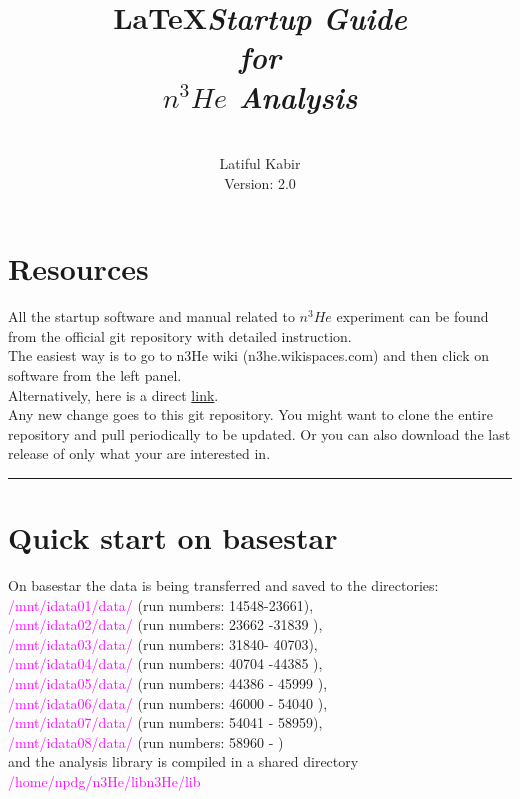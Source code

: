 \documentclass[12pt]{article}
\title{\LaTeX}
\date{}
\title{\emph{\huge\textbf{Startup Guide \\ for \\$n^3He$ Analysis}}
}
\author{\\Latiful Kabir\\
Version: 2.0
}
\begin{document}
  \maketitle
  
\newpage  
\tableofcontents
\newpage
\setcounter{tocdepth}{2}

\section{Resources}
All the startup software and manual related to $n^3He$ experiment can be found from the official git repository with detailed instruction. \\
The easiest way is to go to n3He wiki (n3he.wikispaces.com) and then click on software from the left panel.  \\
Alternatively, here is a direct \href{http://latifkabir.github.io/n3He_Soft/}{link}.\\
Any new change goes to this  git repository. You might want to clone the entire repository and pull periodically to be updated. Or you can also download the last release of only what your are interested in.  

\noindent
{\color{red} \rule{\linewidth}{1mm} }
 
\newpage
\section{Quick start on basestar}
On basestar the data is being transferred and saved to the directories: \\ \textcolor{magenta}{ /mnt/idata01/data/ } (run numbers: 14548-23661),\\ \textcolor{magenta}{ /mnt/idata02/data/ } (run numbers: 23662 -31839 ),\\ \textcolor{magenta}{ /mnt/idata03/data/ } (run numbers: 31840- 40703),\\ \textcolor{magenta}{ /mnt/idata04/data/ } (run numbers: 40704 -44385 ),\\ \textcolor{magenta}{ /mnt/idata05/data/ } (run numbers: 44386 - 45999 ),\\ \textcolor{magenta}{ /mnt/idata06/data/ } (run numbers: 46000 - 54040 ),\\ \textcolor{magenta}{ /mnt/idata07/data/ } (run numbers: 54041 - 58959),\\ \textcolor{magenta}{ /mnt/idata08/data/ } (run numbers: 58960 - )\\and the analysis library is compiled in a shared directory \textcolor{magenta}{ /home/npdg/n3He/libn3He/lib} \\
\end{document}
